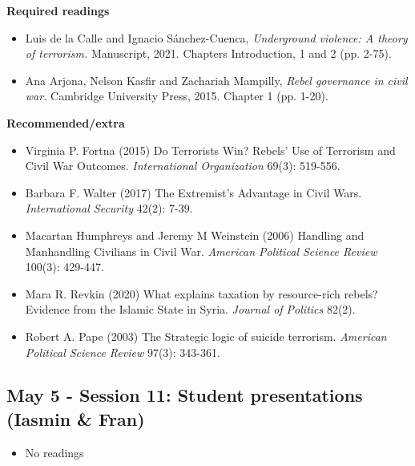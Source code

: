 \documentclass[12pt, a4paper]{article}
\begin{document}
\noindent \textbf{Required readings}

\begin{itemize}
  \item Luis de la Calle and Ignacio Sánchez-Cuenca, \textit{Underground violence: A theory of terrorism.} Manuscript, 2021. Chapters Introduction, 1 and 2 (pp. 2-75).
  \item Ana Arjona, Nelson Kasfir and Zachariah Mampilly, \textit{Rebel governance in civil war.} Cambridge University Press, 2015. Chapter 1 (pp. 1-20).
\end{itemize}

\noindent \textbf{Recommended/extra}

\begin{itemize}
  \item Virginia P. Fortna (2015) Do Terrorists Win? Rebels’ Use of Terrorism and Civil War Outcomes. \textit{International Organization} 69(3): 519-556.
  \item Barbara F. Walter (2017) The Extremist’s Advantage in Civil Wars. \textit{International Security} 42(2): 7-39.
  \item Macartan Humphreys and Jeremy M Weinstein (2006) Handling and Manhandling Civilians in Civil War. \textit{American Political Science Review} 100(3): 429-447.
  \item Mara R. Revkin (2020) What explains taxation by resource-rich rebels? Evidence from the Islamic State in Syria. \textit{Journal of Politics} 82(2).
  \item Robert A. Pape (2003) The Strategic logic of suicide terrorism. \textit{American Political Science Review} 97(3): 343-361.
\end{itemize}

\subsection*{May 5 - Session 11: Student presentations (Iasmin \& Fran)}

\begin{itemize}
  \item No readings
\end{itemize}
\end{document}
